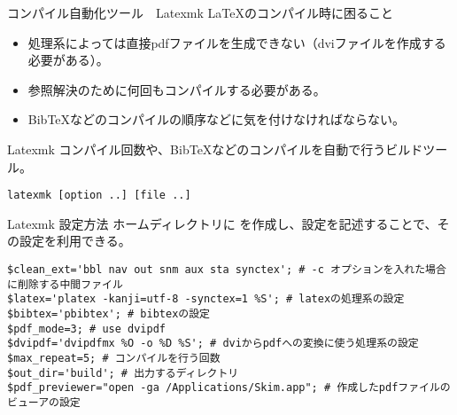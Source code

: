 \documentclass[dvipdfmx,12pt,beamer]{standalone}
\begin{document}
\begin{frame}[fragile]{コンパイル自動化ツール　Latexmk}
	\LaTeX のコンパイル時に困ること
	\begin{itemize}
		\item 処理系によっては直接pdfファイルを生成できない（dviファイルを作成する必要がある）。
		\item 参照解決のために何回もコンパイルする必要がある。
		\item Bib\TeX などのコンパイルの順序などに気を付けなければならない。
	\end{itemize}

	\begin{block}{Latexmk}
		コンパイル回数や、Bib\TeX などのコンパイルを自動で行うビルドツール。
		\begin{lstlisting}
latexmk [option ..] [file ..]
\end{lstlisting}
	\end{block}
\end{frame}

\begin{frame}[fragile]{Latexmk 設定方法}
	ホームディレクトリに を作成し、設定を記述することで、その設定を利用できる。
\begin{lstlisting}[frame=single, caption=.latexmkrc 設定例, basicstyle={\ttfamily\tiny}]
$clean_ext='bbl nav out snm aux sta synctex'; # -c オプションを入れた場合に削除する中間ファイル
$latex='platex -kanji=utf-8 -synctex=1 %S'; # latexの処理系の設定
$bibtex='pbibtex'; # bibtexの設定
$pdf_mode=3; # use dvipdf
$dvipdf='dvipdfmx %O -o %D %S'; # dviからpdfへの変換に使う処理系の設定
$max_repeat=5; # コンパイルを行う回数
$out_dir='build'; # 出力するディレクトリ
$pdf_previewer="open -ga /Applications/Skim.app"; # 作成したpdfファイルのビューアの設定
\end{lstlisting}

\end{frame}
\end{document}
